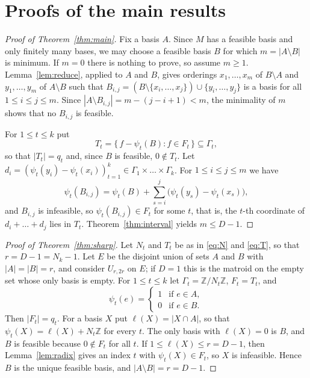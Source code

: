 \documentclass{amsart}
\theoremstyle{definition}
\theoremstyle{remark}
\newcommand{\Z}{\mathbb{Z}}
\begin{document}
\section{Proofs of the main results}\label{sec:proofs}

\begin{proof}[Proof of Theorem~\ref{thm:main}]
Fix a basis $A$. Since $M$ has a feasible basis and only finitely many bases, we may choose a feasible basis $B$ for which $m=|A\setminus B|$ is minimum. If $m=0$ there is nothing to prove, so assume $m\ge1$. Lemma~\ref{lem:reduce}, applied to $A$ and $B$, gives orderings $x_1,\dots,x_m$ of $B\setminus A$ and $y_1,\dots,y_m$ of $A\setminus B$ such that $B_{i,j}=(B\setminus\{x_i,\dots,x_j\})\cup\{y_i,\dots,y_j\}$ is a basis for all $1\le i\le j\le m$. Since $|A\setminus B_{i,j}|=m-(j-i+1)<m$, the minimality of $m$ shows that no $B_{i,j}$ is feasible.

For $1\le t\le k$ put
\[
T_t=\{\,f-\psi_t(B): f\in F_t\,\}\subseteq\Gamma_t,
\]
so that $|T_t|=q_t$ and, since $B$ is feasible, $0\notin T_t$. Let $d_i=(\psi_t(y_i)-\psi_t(x_i))_{t=1}^k\in\Gamma_1\times\dots\times\Gamma_k$. For $1\le i\le j\le m$ we have
\[
\psi_t(B_{i,j})=\psi_t(B)+\sum_{s=i}^j\bigl(\psi_t(y_s)-\psi_t(x_s)\bigr),
\]
and $B_{i,j}$ is infeasible, so $\psi_t(B_{i,j})\in F_t$ for some $t$, that is, the $t$-th coordinate of $d_i+\dots+d_j$ lies in $T_t$. Theorem~\ref{thm:interval} yields $m\le D-1$.
\end{proof}

\begin{proof}[Proof of Theorem~\ref{thm:sharp}]
Let $N_t$ and $T_t$ be as in \eqref{eq:N} and \eqref{eq:T}, so that $r=D-1=N_k-1$. Let $E$ be the disjoint union of sets $A$ and $B$ with $|A|=|B|=r$, and consider $U_{r,2r}$ on $E$; if $D=1$ this is the matroid on the empty set whose only basis is empty. For $1\le t\le k$ let $\Gamma_t=\Z/N_t\Z$, $F_t=T_t$, and
\[
\psi_t(e)=\begin{cases}1&\text{if }e\in A,\\ 0&\text{if }e\in B.\end{cases}
\]
Then $|F_t|=q_t$. For a basis $X$ put $\ell(X)=|X\cap A|$, so that $\psi_t(X)=\ell(X)+N_t\Z$ for every $t$. The only basis with $\ell(X)=0$ is $B$, and $B$ is feasible because $0\notin F_t$ for all $t$. If $1\le\ell(X)\le r=D-1$, then Lemma~\ref{lem:radix} gives an index $t$ with $\psi_t(X)\in F_t$, so $X$ is infeasible. Hence $B$ is the unique feasible basis, and $|A\setminus B|=r=D-1$.
\end{proof}
\end{document}
